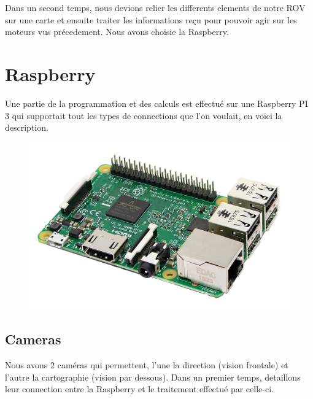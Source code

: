 \documentclass[a4paper,11pt]{report}
\begin{document}
	Dans un second temps, nous devions relier les differents elements de notre ROV sur une carte et ensuite traiter les informations reçu pour pouvoir agir sur les moteurs vus précedement. Nous avons choisie la Raspberry.
	
	\section{Raspberry}
		Une partie de la programmation et des calculs est effectué sur une Raspberry PI 3 qui supportait tout les types de connections que l'on voulait, en voici la description.
			\begin{figure}[!h]
					\begin{center}
						\includegraphics[scale=0.2]{Photos/Raspberry.jpg}
					\end{center}
				\end{figure}
				
		\subsection{Cameras}
			Nous avons 2 caméras qui permettent, l'une la direction (vision frontale) et l'autre la cartographie (vision par dessous). Dans un premier temps, detaillons leur connection entre la Raspberry et le traitement effectué par celle-ci.
			
\end{document}
